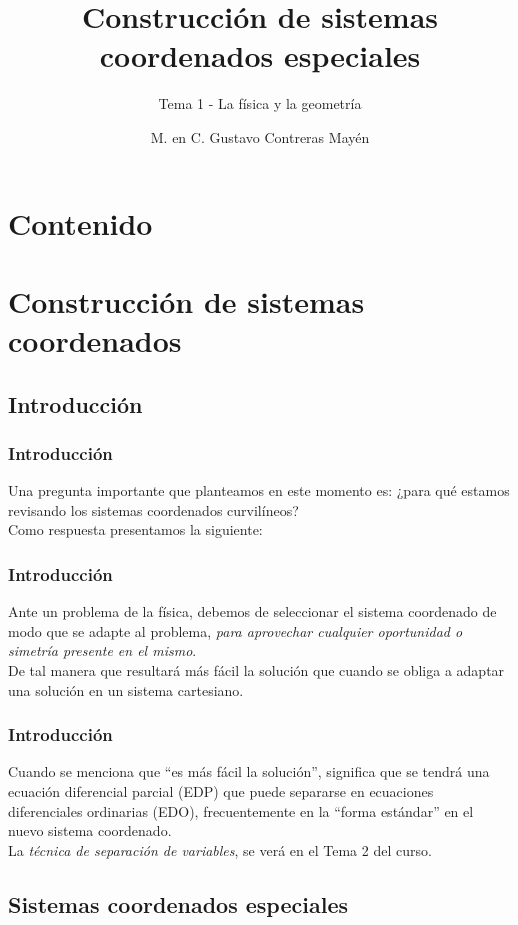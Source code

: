 \documentclass[12pt]{beamer}
\title{\large{Construcción de sistemas coordenados especiales}}
\subtitle{Tema 1 - La física y la geometría}
\author{M. en C. Gustavo Contreras Mayén}
\date{}
\begin{document}
\maketitle
\fontsize{14}{14}\selectfont
{}

\section*{Contenido}

\section{Construcción de sistemas coordenados}
\subsection{Introducción}

\begin{frame}
\frametitle{Introducción}
Una pregunta importante que planteamos en este momento es: ¿para qué estamos revisando los sistemas coordenados curvilíneos?
\\
\bigskip
\pause
Como respuesta presentamos la siguiente:
\end{frame}
\begin{frame}
\frametitle{Introducción}
Ante un problema de la física, debemos de seleccionar el sistema coordenado de modo que se adapte al problema, \emph{para aprovechar cualquier oportunidad o simetría presente en el mismo}.
\\
\bigskip
\pause
De tal manera que resultará más fácil la solución que cuando se obliga a adaptar una solución en un sistema cartesiano.
\end{frame}
\begin{frame}
\frametitle{Introducción}
Cuando se menciona que \enquote{es más fácil la solución}, significa que se tendrá una ecuación diferencial parcial (EDP) que puede separarse en ecuaciones diferenciales ordinarias (EDO), frecuentemente en la \enquote{forma estándar} en el nuevo sistema coordenado.
\\
\bigskip
\pause
La \emph{técnica de separación de variables}, se verá en el Tema 2 del curso.
\end{frame}

\subsection{Sistemas coordenados especiales}
\end{document}
